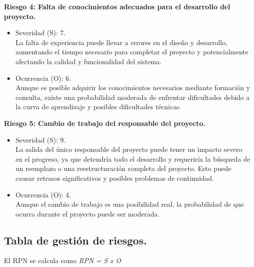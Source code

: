 \textbf{Riesgo 4: Falta de conocimientos adecuados para el desarrollo del
	proyecto.}
\begin{itemize}
	\item Severidad (S): 7.\\ La falta de experiencia puede llevar a errores en el diseño
	      y desarrollo, aumentando el tiempo necesario para completar el proyecto y
	      potencialmente afectando la calidad y funcionalidad del sistema.
	\item Ocurrencia (O): 6.\\ Aunque es posible adquirir los conocimientos necesarios
	      mediante formación y consulta, existe una probabilidad moderada de enfrentar
	      dificultades debido a la curva de aprendizaje y posibles dificultades técnicas.
\end{itemize}

\textbf{Riesgo 5: Cambio de trabajo del responsable del proyecto.}
\begin{itemize}
	\item Severidad (S): 9.\\ La salida del único responsable del proyecto puede tener un
	      impacto severo en el progreso, ya que detendría todo el desarrollo y requeriría
	      la búsqueda de un reemplazo o una reestructuración completa del proyecto. Esto
	      puede causar retrasos significativos y posibles problemas de continuidad.
	\item Ocurrencia (O): 4.\\ Aunque el cambio de trabajo es una posibilidad real, la
	      probabilidad de que ocurra durante el proyecto puede ser moderada.
\end{itemize}

\subsection{Tabla de gestión de riesgos.}

El RPN se calcula como \textit{RPN = S x O}

